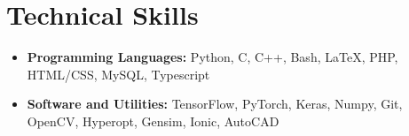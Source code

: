 \section*{Technical Skills}
\begin{itemize}

\setlength\itemsep{0pt}
\item \textbf{Programming Languages:} Python, C, C++, Bash, \LaTeX, PHP, HTML/CSS, MySQL, Typescript
\item \textbf{Software and Utilities:} TensorFlow, PyTorch, Keras, Numpy, Git, OpenCV, Hyperopt, Gensim, Ionic, AutoCAD

\end{itemize}
